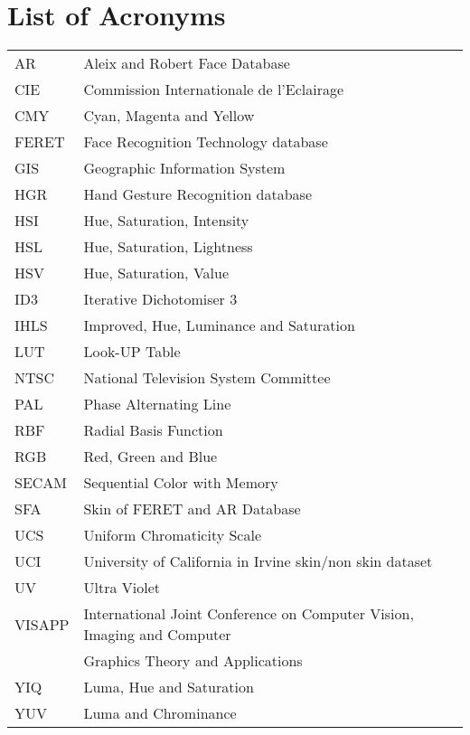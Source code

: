 \documentclass[12pt,twoside,a4paper]{book}
\theoremstyle{plain}
\theoremstyle{definition}
\begin{document}
\chapter{List of Acronyms}
\begin{tabular}{ll}
    AR          & Aleix and Robert Face Database\\
    CIE         & Commission Internationale de l'Eclairage\\
    CMY         & Cyan, Magenta and Yellow\\
    FERET       & Face Recognition Technology database\\
    GIS         & Geographic Information System\\
    HGR         & Hand Gesture Recognition database\\
    HSI         & Hue, Saturation, Intensity\\
    HSL         & Hue, Saturation, Lightness\\
    HSV         & Hue, Saturation, Value\\
    ID3         & Iterative Dichotomiser 3\\
    IHLS        & Improved, Hue, Luminance and Saturation\\
    LUT         & Look-UP Table\\
    NTSC        & National Television System Committee\\
    PAL         & Phase Alternating Line\\
    RBF         & Radial Basis Function\\
    RGB         & Red, Green and Blue\\
    SECAM       & Sequential Color with Memory\\
    SFA         & Skin of FERET and AR Database\\
    UCS         & Uniform Chromaticity Scale\\
    UCI         & University of California in Irvine skin/non skin dataset\\
    UV          & Ultra Violet\\
    VISAPP      & International Joint Conference on Computer Vision, Imaging and Computer\\
                & Graphics Theory and Applications\\
    YIQ         & Luma, Hue and Saturation\\
    YUV         & Luma and Chrominance\\
\end{tabular}
\end{document}
